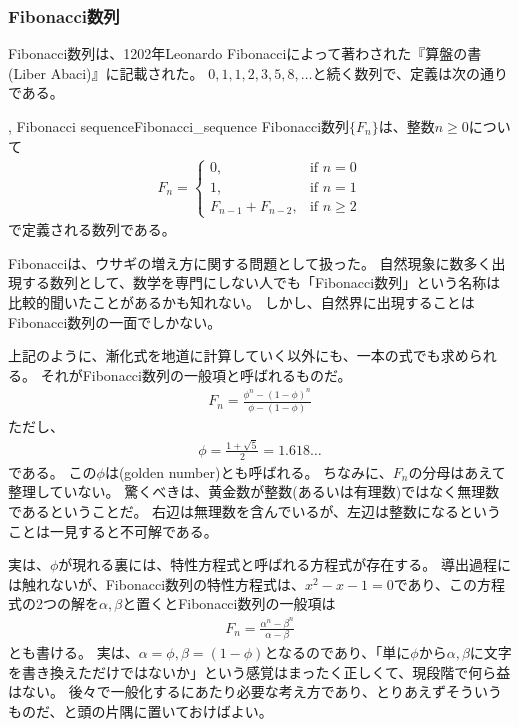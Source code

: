 \subsubsection{Fibonacci数列}
Fibonacci数列は、1202年Leonardo Fibonacciによって著わされた『算盤の書(Liber Abaci)』に記載された。
$0,1,1,2,3,5,8,\ldots$と続く数列で、定義は次の通りである。

\begin{Defi}{, Fibonacci sequence}{Fibonacci_sequence}
Fibonacci数列$\{F_n\}$は、整数$n\ge0$について
\begin{align*}
F_n =
\begin{cases}
0, &\mbox{if } n = 0\\
1, &\mbox{if } n = 1\\
F_{n - 1} + F_{n - 2}, &\mbox{if } n \ge 2
\end{cases}
\end{align*}
で定義される数列である。
\end{Defi}

Fibonacciは、ウサギの増え方に関する問題として扱った。
自然現象に数多く出現する数列として、数学を専門にしない人でも「Fibonacci数列」という名称は比較的聞いたことがあるかも知れない。
しかし、自然界に出現することはFibonacci数列の一面でしかない。


上記のように、漸化式を地道に計算していく以外にも、一本の式でも求められる。
それがFibonacci数列の一般項と呼ばれるものだ。
\begin{align*}
F_n = \frac{\phi^n - (1 - \phi)^n}{\phi - (1 - \phi)}
\end{align*}
ただし、
\begin{align*}
\phi = \frac{1 + \sqrt{5}}{2} = 1.618\ldots
\end{align*}
である。
この$\phi$は(golden number)とも呼ばれる。
ちなみに、$F_n$の分母はあえて整理していない。
驚くべきは、黄金数が整数(あるいは有理数)ではなく無理数であるということだ。
右辺は無理数を含んでいるが、左辺は整数になるということは一見すると不可解である。

実は、$\phi$が現れる裏には、特性方程式と呼ばれる方程式が存在する。
導出過程には触れないが、Fibonacci数列の特性方程式は、$x^2-x-1=0$であり、この方程式の2つの解を$\alpha, \beta$と置くとFibonacci数列の一般項は
\begin{align*}
F_n = \frac{\alpha^n - \beta^n}{\alpha - \beta}
\end{align*}
とも書ける。
実は、$\alpha=\phi,\beta=(1-\phi)$となるのであり、「単に$\phi$から$\alpha, \beta$に文字を書き換えただけではないか」という感覚はまったく正しくて、現段階で何ら益はない。
後々で一般化するにあたり必要な考え方であり、とりあえずそういうものだ、と頭の片隅に置いておけばよい。

